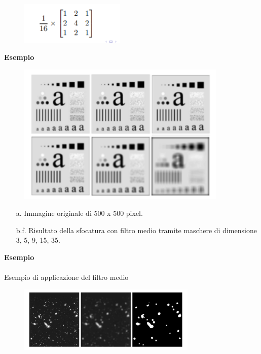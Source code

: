 \begin{figure}[H]
    \centering
    \includegraphics[width=5cm, keepaspectratio]{capitoli/immagini/imgs/filtro-gaussiano.png}
\end{figure}

\textbf{Esempio}

\begin{figure}[H]
    \centering
    \includegraphics[width=10cm, keepaspectratio]{capitoli/immagini/imgs/filtri-l-esempio.png}
\end{figure}

\begin{enumerate}
    \item [a.] Immagine originale di 500 x 500 pixel.
    \item [b.f.] Risultato della sfocatura con filtro medio tramite maschere di
          dimensione 3, 5, 9, 15, 35.
\end{enumerate}
\textbf{Esempio}
\\\\
Esempio di applicazione del filtro medio
\begin{figure}[H]
    \centering
    \includegraphics[width=\linewidth, keepaspectratio]{capitoli/immagini/imgs/filtro-l-esempio2.png}
\end{figure}

